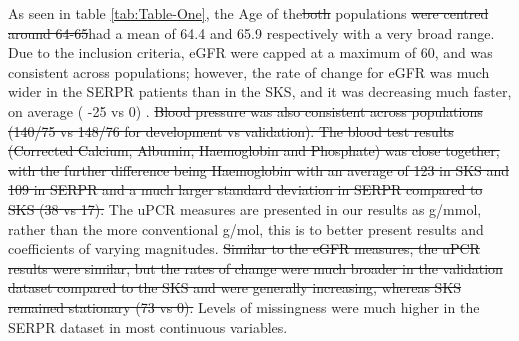 \documentclass[12pt,PhD,twoside,openright]{muthesis}
\begin{document}
As seen in table \ref{tab:Table-One}, the Age of the\sout{both} populations \sout{were centred around 64-65}had a mean of 64.4 and 65.9 respectively with a very broad range. Due to the inclusion criteria, eGFR were capped at a maximum of 60, and was consistent across populations; however, the rate of change for eGFR was much wider in the SERPR patients than in the SKS, and it was decreasing much faster, on average ( -25 vs 0) . \sout{Blood pressure was also consistent across populations (140/75 vs 148/76 for development vs validation). The blood test results (Corrected Calcium, Albumin, Haemoglobin and Phosphate) was close together, with the further difference being Haemoglobin with an average of 123 in SKS and 109 in SERPR and a much larger standard deviation in SERPR compared to SKS (38 vs 17).} The uPCR measures are presented in our results as g/mmol, rather than the more conventional g/mol, this is to better present results and coefficients of varying magnitudes. \sout{Similar to the eGFR measures, the uPCR results were similar, but the rates of change were much broader in the validation dataset compared to the SKS and were generally increasing, whereas SKS remained stationary (73 vs 0).} Levels of missingness were much higher in the SERPR dataset in most continuous variables.
\end{document}
